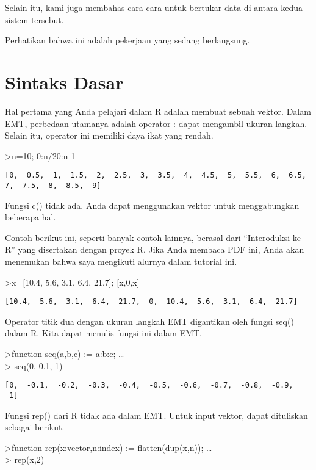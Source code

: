 \documentclass[
]{book}
\begin{document}
Selain itu, kami juga membahas cara-cara untuk bertukar data di antara kedua sistem tersebut.

Perhatikan bahwa ini adalah pekerjaan yang sedang berlangsung.

\section{Sintaks Dasar}\label{sintaks-dasar-1}

Hal pertama yang Anda pelajari dalam R adalah membuat sebuah vektor. Dalam EMT, perbedaan utamanya adalah operator : dapat mengambil ukuran langkah. Selain itu, operator ini memiliki daya ikat yang rendah.

\textgreater n=10; 0:n/20:n-1

\begin{verbatim}
[0,  0.5,  1,  1.5,  2,  2.5,  3,  3.5,  4,  4.5,  5,  5.5,  6,  6.5,
7,  7.5,  8,  8.5,  9]
\end{verbatim}

Fungsi c() tidak ada. Anda dapat menggunakan vektor untuk menggabungkan beberapa hal.

Contoh berikut ini, seperti banyak contoh lainnya, berasal dari ``Interoduksi ke R'' yang disertakan dengan proyek R. Jika Anda membaca PDF ini, Anda akan menemukan bahwa saya mengikuti alurnya dalam tutorial ini.

\textgreater x={[}10.4, 5.6, 3.1, 6.4, 21.7{]}; {[}x,0,x{]}

\begin{verbatim}
[10.4,  5.6,  3.1,  6.4,  21.7,  0,  10.4,  5.6,  3.1,  6.4,  21.7]
\end{verbatim}

Operator titik dua dengan ukuran langkah EMT digantikan oleh fungsi seq() dalam R. Kita dapat menulis fungsi ini dalam EMT.

\textgreater function seq(a,b,c) := a:b:c; \ldots{}\\
\textgreater{} seq(0,-0.1,-1)

\begin{verbatim}
[0,  -0.1,  -0.2,  -0.3,  -0.4,  -0.5,  -0.6,  -0.7,  -0.8,  -0.9,  -1]
\end{verbatim}

Fungsi rep() dari R tidak ada dalam EMT. Untuk input vektor, dapat dituliskan sebagai berikut.

\textgreater function rep(x:vector,n:index) := flatten(dup(x,n)); \ldots{}\\
\textgreater{} rep(x,2)
\end{document}
